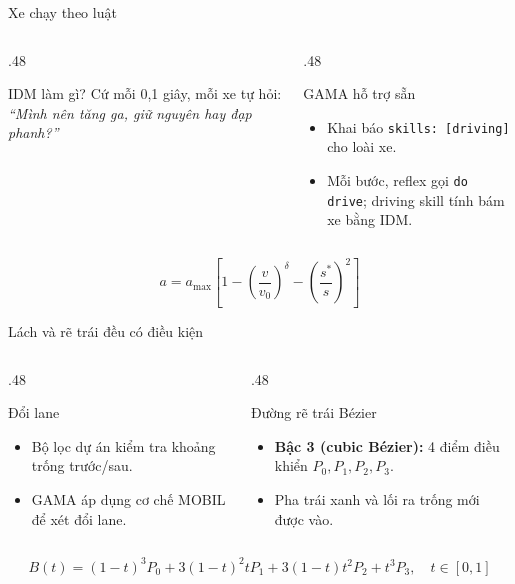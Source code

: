 \documentclass[aspectratio=169,10pt]{beamer}
\begin{document}
  \begin{frame}{Xe chạy theo luật}
    \relax
    \begin{columns}[T,onlytextwidth]
      \begin{column}{.48\textwidth}
        \begin{block}{IDM làm gì?}
          Cứ mỗi 0,1 giây, mỗi xe tự hỏi: \emph{“Mình nên tăng ga, giữ nguyên hay đạp phanh?”}
        \end{block}
      \end{column}
      \begin{column}{.48\textwidth}
        \begin{block}{GAMA hỗ trợ sẵn}
          \begin{itemize}
            \item Khai báo \texttt{skills: [driving]} cho loài xe.
            \item Mỗi bước, reflex gọi \texttt{do drive}; driving skill tính bám xe bằng IDM.
          \end{itemize}
        \end{block}
      \end{column}
    \end{columns}
    \vspace{.3cm}
    \[
      a=a_{\max}\left[1-\left(\frac{v}{v_0}\right)^\delta-\left(\frac{s^*}{s}\right)^2\right]
    \]
  \end{frame}
  \begin{frame}{Lách và rẽ trái đều có điều kiện}
    \relax
    \begin{columns}[T,onlytextwidth]
      \begin{column}{.48\textwidth}
        \begin{block}{Đổi lane}
          \begin{itemize}
            \item Bộ lọc dự án kiểm tra khoảng trống trước/sau.
            \item GAMA áp dụng cơ chế MOBIL để xét đổi lane.
          \end{itemize}
        \end{block}
      \end{column}
      \begin{column}{.48\textwidth}
        \begin{block}{Đường rẽ trái Bézier}
          \begin{itemize}
            \item \textbf{Bậc 3 (cubic Bézier):} 4 điểm điều khiển $P_0,P_1,P_2,P_3$.
            \item Pha trái xanh và lối ra trống mới được vào.
          \end{itemize}
        \end{block}
      \end{column}
    \end{columns}
    \vspace{.1cm}
    \[
      B(t)=(1-t)^3P_0+3(1-t)^2tP_1+3(1-t)t^2P_2+t^3P_3,\quad t\in[0,1]
    \]
  \end{frame}
\end{document}
